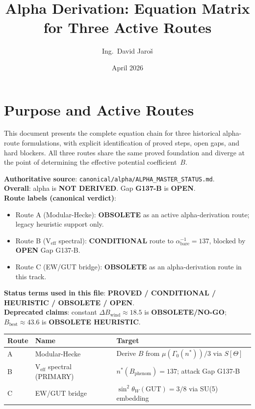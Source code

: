 \documentclass[12pt,a4paper]{article}
\title{\textbf{Alpha Derivation: Equation Matrix for Three Active Routes}}
\author{Ing.\ David Jaro\v{s}}
\date{April 2026}
\theoremstyle{definition}
\theoremstyle{remark}
\begin{document}
  \maketitle
\fi

\section{Purpose and Active Routes}
\label{sec:alpha_eq_purpose}

This document presents the complete equation chain for three historical
alpha-route formulations, with explicit identification of
proved steps, open gaps, and hard blockers.
All three routes share the same proved foundation and diverge at the
point of determining the effective potential coefficient~$B$.

\begin{tcolorbox}[colback=red!4!white,colframe=red!65!black,
title=Canonical status overlay (2026-05-10)]
\textbf{Authoritative source}: \texttt{canonical/alpha/ALPHA\_MASTER\_STATUS.md}.\\
\textbf{Overall}: alpha is \textbf{NOT DERIVED}. Gap \textbf{G137-B} is \textbf{OPEN}.\\
\textbf{Route labels (canonical verdict)}:
\begin{itemize}
  \item Route A (Modular-Hecke): \textbf{OBSOLETE} as an active alpha-derivation route; legacy heuristic support only.
  \item Route B (V\(_{\mathrm{eff}}\) spectral): \textbf{CONDITIONAL} route to $\alpha^{-1}_{\mathrm{bare}}=137$, blocked by \textbf{OPEN} Gap G137-B.
  \item Route C (EW/GUT bridge): \textbf{OBSOLETE} as an alpha-derivation route in this track.
\end{itemize}
\textbf{Status terms used in this file}: \textbf{PROVED / CONDITIONAL / HEURISTIC / OBSOLETE / OPEN}.\\
\textbf{Deprecated claims}: constant $\Delta B_{\mathrm{wind}}\approx 18.5$ is \textbf{OBSOLETE/NO-GO};
$B_{\mathrm{best}}\approx 43.6$ is \textbf{OBSOLETE HEURISTIC}.
\end{tcolorbox}

\begin{tcolorbox}[colback=blue!3!white,colframe=blue!50!black,title=Active Routes]
\begin{tabular}{lll}
\toprule
\textbf{Route} & \textbf{Name} & \textbf{Target} \\
\midrule
A & Modular-Hecke & Derive $B$ from $\mu(\Gamma_0(n^*))/3$ via $S[\Theta]$ \\
B & V$_{\mathrm{eff}}$ spectral (PRIMARY) & $n^*(B_{\mathrm{phenom}}) = 137$; attack Gap G137-B \\
C & EW/GUT bridge & $\sin^2\theta_W(\mathrm{GUT}) = 3/8$ via SU(5) embedding \\
\bottomrule
\end{tabular}
\end{tcolorbox}
\end{document}
